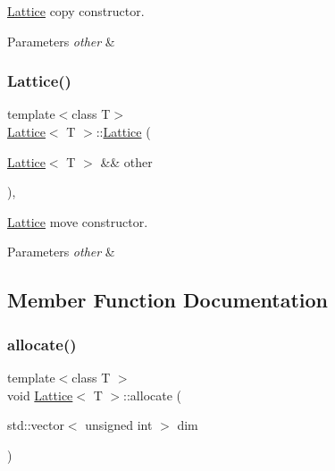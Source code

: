 \mbox{\hyperlink{class_lattice}{Lattice}} copy constructor. 


\begin{DoxyParams}{Parameters}
{\em other} & \\
\hline
\end{DoxyParams}
\mbox{\label{class_lattice_ad2826da8e42dcaea917b9a2e50ca1ca2}} 
\subsubsection{\texorpdfstring{Lattice()}{Lattice()}\hspace{0.1cm}{\footnotesize\ttfamily [4/4]}}
{\footnotesize\ttfamily template$<$class T$>$ \\
\mbox{\hyperlink{class_lattice}{Lattice}}$<$ T $>$\+::\mbox{\hyperlink{class_lattice}{Lattice}} (\begin{DoxyParamCaption}\item[{\mbox{\hyperlink{class_lattice}{Lattice}}$<$ T $>$ \&\&}]{other }\end{DoxyParamCaption})\hspace{0.3cm}{\ttfamily [inline]}, {\ttfamily [noexcept]}}



\mbox{\hyperlink{class_lattice}{Lattice}} move constructor. 


\begin{DoxyParams}{Parameters}
{\em other} & \\
\hline
\end{DoxyParams}


\subsection{Member Function Documentation}
\mbox{\label{class_lattice_a5b4e162f06f7b4b90b4a9335ed2aabb5}} 
\subsubsection{\texorpdfstring{allocate()}{allocate()}}
{\footnotesize\ttfamily template$<$class T $>$ \\
void \mbox{\hyperlink{class_lattice}{Lattice}}$<$ T $>$\+::allocate (\begin{DoxyParamCaption}\item[{std\+::vector$<$ unsigned int $>$}]{dim }\end{DoxyParamCaption})\hspace{0.3cm}{\ttfamily [inline]}}



